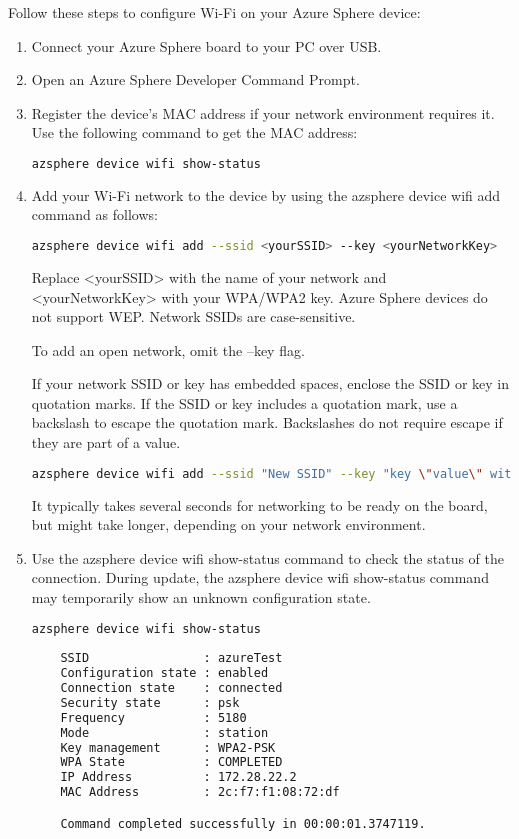 Follow these steps to configure Wi-Fi on your Azure Sphere device:
\begin{enumerate}
    \item Connect your Azure Sphere board to your PC over USB.
    \item Open an Azure Sphere Developer Command Prompt.

    \item Register the device's MAC address if your network environment requires it. Use the following command to get the MAC address:
    \begin{lstlisting}[language=bash]
    azsphere device wifi show-status
    \end{lstlisting}
    \item Add your Wi-Fi network to the device by using the azsphere device wifi add command as follows:
    \begin{lstlisting}[language=bash]
    azsphere device wifi add --ssid <yourSSID> --key <yourNetworkKey>
    \end{lstlisting}
    
    Replace <yourSSID> with the name of your network and <yourNetworkKey> with your WPA/WPA2 key. Azure Sphere devices do not support WEP. Network SSIDs are case-sensitive. 

    To add an open network, omit the --key flag.

    If your network SSID or key has embedded spaces, enclose the SSID or key in quotation marks. If the SSID or key includes a quotation mark, use a backslash to escape the quotation mark. Backslashes do not require escape if they are part of a value.
    
    \begin{lstlisting}[language=bash]
    azsphere device wifi add --ssid "New SSID" --key "key \"value\" with quotes"
    \end{lstlisting}
    
    It typically takes several seconds for networking to be ready on the board, but might take longer, depending on your network environment.

    \item Use the azsphere device wifi show-status command to check the status of the connection. During update, the azsphere device wifi show-status command may temporarily show an unknown configuration state. 
    \begin{lstlisting}[language=bash]
    azsphere device wifi show-status
    
    SSID                : azureTest
    Configuration state : enabled
    Connection state    : connected
    Security state      : psk
    Frequency           : 5180
    Mode                : station
    Key management      : WPA2-PSK
    WPA State           : COMPLETED
    IP Address          : 172.28.22.2
    MAC Address         : 2c:f7:f1:08:72:df

    Command completed successfully in 00:00:01.3747119.
    \end{lstlisting}
\end{enumerate}


